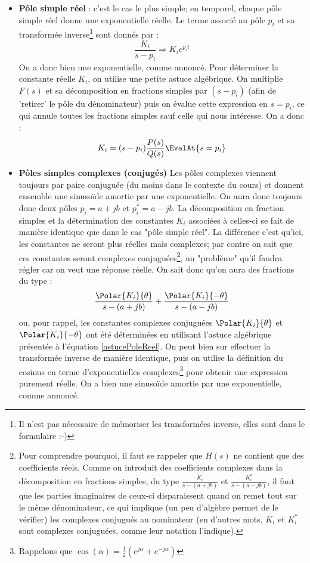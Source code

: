 \begin{itemize}
\item \textbf{Pôle simple réel} : c'est le cas le plus simple; en temporel, chaque pôle simple réel donne une exponentielle réelle. Le terme associé au pôle $p_i$ et sa transformée inverse\footnote{Il n'est pas nécessaire de mémoriser les transformées inverse, elles sont dans le formulaire :-)} sont donnés par :
\begin{equation}
\frac{K_i}{s - p_i} \Longrightarrow K_i e^{p_it}
\end{equation}
On a donc bien une exponentielle, comme annoncé. Pour déterminer la constante réelle $K_i$, on utilise une petite astuce algébrique. On multiplie $F(s)$ et sa décomposition en fractions simples par $(s - p_i)$ (afin de 'retirer' le pôle du dénominateur) puis on évalue cette expression en $s = p_i$, ce qui annule toutes les fractions simples sauf celle qui nous intéresse. On a donc :
\begin{equation}
\label{astucePoleReel}
K_i = (s-p_i)\frac{P(s)}{Q(s)} \EvalAt{s = p_i}
\end{equation}
\item \textbf{Pôles simples complexes (conjugés)} Les pôles complexes viennent toujours par paire conjuguée (du moins dans le contexte du cours) et donnent ensemble une sinusoïde amortie par une exponentielle. On aura donc toujours donc deux pôles $p_i = a + jb$ et $p_i^{*} = a - jb$. La décomposition en fraction simples et la détermination des constantes $K_i$ associées à celles-ci se fait de manière identique que dans le cas "pôle simple réel". La différence c'est qu'ici, les constantes ne seront plus réelles mais complexes; par contre on sait que ces constantes seront complexes conjuguées\footnote{Pour comprendre pourquoi, il faut se rappeler que $H(s)$ ne contient que des coefficients réels. Comme on introduit des coefficients complexes dans la décomposition en fractions simples, du type $\frac{K_i}{s - (a + jb)}$ et $\frac{K_i^{*}}{s - (a - jb)}$, il faut que les parties imaginaires de ceux-ci disparaissent quand on remet tout sur le même dénominateur, ce qui implique (un peu d'algèbre permet de le vérifier) les complexes conjugués au nominateur (en d'autres mots, $K_i$ et $K_i^{*}$ sont complexes conjuguées, comme leur notation l'indique).}, un "problème" qu'il faudra régler car on veut une réponse réelle. On sait donc qu'on aura des fractions du type :
\begin{equation}
\frac{\Polar{K_i}{\theta}}{s - (a + jb)} + \frac{\Polar{K_i}{- \theta}}{s - (a - jb)}
\end{equation}
ou, pour rappel, les constantes complexes conjuguées $\Polar{K_i}{\theta}$ et $\Polar{K_i}{-\theta}$ ont été déterminées en utilisant l'astuce algébrique présentée à l'équation \ref{astucePoleReel}. On peut bien sur effectuer la transformée inverse de manière identique, puis on utilise la définition du cosinus en terme d'exponentielles complexes\footnote{Rappelons que $\cos (\alpha) = \frac{1}{2} (e^{j \alpha} + e^{-j \alpha})$} pour obtenir une expression purement réelle. On a bien une sinusoïde amortie par une exponentielle, comme annoncé.


\end{itemize}
